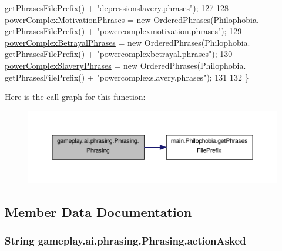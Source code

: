 \begin{DoxyCode}
      getPhrasesFilePrefix() + \textcolor{stringliteral}{"depressionslavery.phrases"});
127 
128         \hyperlink{classgameplay_1_1ai_1_1phrasing_1_1_phrasing_ad566ad78166872e95e920833f4f36e90}{powerComplexMotivationPhrases} = \textcolor{keyword}{new} OrderedPhrases(Philophobia.
      getPhrasesFilePrefix() + \textcolor{stringliteral}{"powercomplexmotivation.phrases"});
129         \hyperlink{classgameplay_1_1ai_1_1phrasing_1_1_phrasing_a77e67b74525c919463d3c9b830fe895d}{powerComplexBetrayalPhrases} = \textcolor{keyword}{new} OrderedPhrases(Philophobia.
      getPhrasesFilePrefix() + \textcolor{stringliteral}{"powercomplexbetrayal.phrases"});
130         \hyperlink{classgameplay_1_1ai_1_1phrasing_1_1_phrasing_afc6cf63da008d88b88e0e8138bb2fda9}{powerComplexSlaveryPhrases} = \textcolor{keyword}{new} OrderedPhrases(Philophobia.
      getPhrasesFilePrefix() + \textcolor{stringliteral}{"powercomplexslavery.phrases"});
131 
132     \}
\end{DoxyCode}


Here is the call graph for this function\-:\nopagebreak
\begin{figure}[H]
\begin{center}
\leavevmode
\includegraphics[width=350pt]{classgameplay_1_1ai_1_1phrasing_1_1_phrasing_a369fb65d1e9363006fb8f4fa31b438de_cgraph}
\end{center}
\end{figure}




\subsection{Member Data Documentation}
\hypertarget{classgameplay_1_1ai_1_1phrasing_1_1_phrasing_a613e36f3cca02a5ff83401e2373effd9}{
\subsubsection[{action\-Asked}]{\setlength{\rightskip}{0pt plus 5cm}String gameplay.\-ai.\-phrasing.\-Phrasing.\-action\-Asked\hspace{0.3cm}{\ttfamily [protected]}}}\label{classgameplay_1_1ai_1_1phrasing_1_1_phrasing_a613e36f3cca02a5ff83401e2373effd9}


